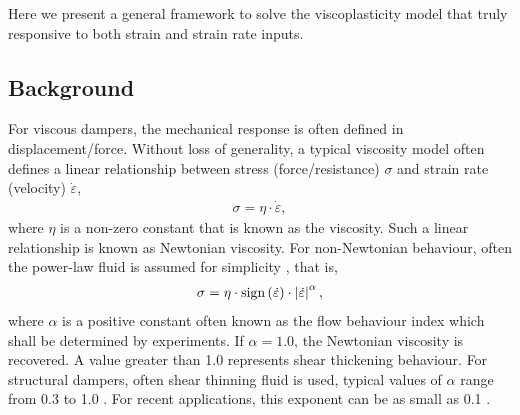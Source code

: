 Here we present a general framework \cite{Chang2022a} to solve the viscoplasticity model that truly responsive to both strain and strain rate inputs.
\subsection{Background}
For viscous dampers, the mechanical response is often defined in displacement/force. Without loss of generality, a typical viscosity model often defines a linear relationship between stress (force/resistance) $\sigma$ and strain rate (velocity) $\dot{\varepsilon}$,
\begin{gather}
\sigma=\eta\cdot\dot{\varepsilon},
\end{gather}
where $\eta$ is a non-zero constant that is known as the viscosity. Such a linear relationship is known as Newtonian viscosity. For non-Newtonian behaviour, often the power-law fluid is assumed for simplicity \cite{Wu2016}, that is,
\begin{gather}
\sigma=\eta\cdot\text{sign}\left(\dot{\varepsilon}\right)\cdot\left\lvert\dot{\varepsilon}\right\rvert^{\alpha},
\end{gather}
where $\alpha$ is a positive constant often known as the flow behaviour index which shall be determined by experiments. If $\alpha=1.0$, the Newtonian viscosity is recovered. A value greater than \num{1.0} represents shear thickening behaviour. For structural dampers, often shear thinning fluid is used, typical values of $\alpha$ range from \num{0.3} to \num{1.0} \cite{Lee2001}. For recent applications, this exponent can be as small as \num{0.1} \cite{Lago2018}.
